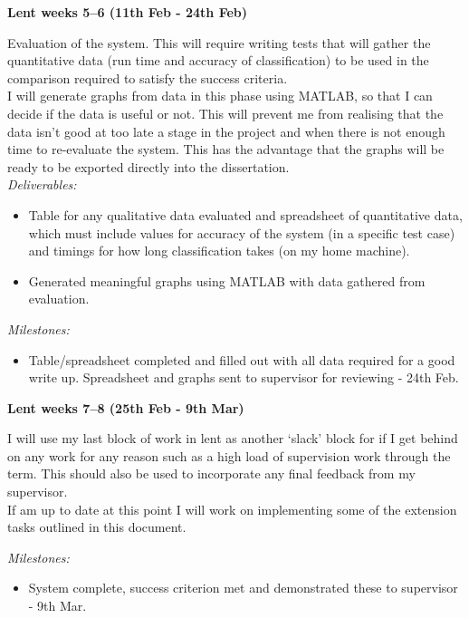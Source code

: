 {\bf Lent weeks 5--6 (11th Feb - 24th Feb)} 

Evaluation of the system. This will require writing tests that will gather 
the quantitative data (run time and accuracy of classification) to be used in 
the comparison required to satisfy the success criteria.\\

I will generate graphs from data in this phase using MATLAB, so that I can 
decide if the data is useful or not. This will prevent me from realising that 
the data isn't good at too late a stage in the project and when there is not 
enough time to re-evaluate the system. This has the advantage that the graphs 
will be ready to be exported directly into the dissertation. \\

{\em Deliverables:} 
\begin{itemize} 
    \item 
    Table for any qualitative data evaluated and spreadsheet of quantitative 
    data, which must include values for accuracy of the system (in a specific 
    test case) and timings for how long classification takes (on my home 
    machine).
    \item 
    Generated meaningful graphs using MATLAB with data gathered from evaluation.
\end{itemize}

{\em Milestones:}
\begin{itemize}
    \item 
    Table/spreadsheet completed and filled out with all data required for a good 
    write up. Spreadsheet and graphs sent to supervisor for reviewing - 24th Feb.
\end{itemize}




{\bf Lent weeks 7--8 (25th Feb - 9th Mar)} 

I will use my last block of work in lent as another `slack' block for if I get 
behind on any work for any reason such as a high load of supervision work 
through the term. This should also be used to incorporate any final feedback 
from my supervisor. \\

If am up to date at this point  I will work on implementing some of the 
extension tasks outlined in this document.

{\em Milestones:}
\begin{itemize}
    \item 
    System complete, success criterion met and demonstrated these to supervisor 
    - 9th Mar.
\end{itemize}





